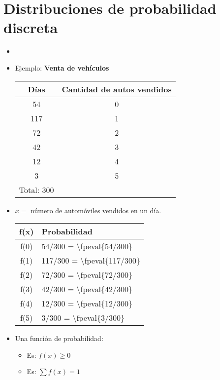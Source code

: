 \documentclass{article}
\begin{document}
\section{Distribuciones de probabilidad discreta}
\begin{itemize}
    \item {} 
    \item Ejemplo: \textbf{Venta de vehículos}
        \begin{center}
            \begin{tabular}{ |c|c| }
                \hline
                    Días & Cantidad de autos vendidos \\
                \hline
                    54 & 0 \\ 
                    117 &1 \\ 
                    72&2 \\ 
                    42&3 \\ 
                    12&4 \\ 
                    3&5 \\ 
                \hline
                    Total: 300 & \\ 
                \hline
            \end{tabular}
        \end{center}

    \item $x=$ número de automóviles vendidos en un día.  
        \begin{center}
            \begin{tabular}{ |c|l| }
                \hline
                    f(x) &  Probabilidad   \\
                \hline
                    f(0) & 54/300 = \num{\fpeval{54/300}} \\ 
                    f(1) & 117/300 = \num{\fpeval{117/300}}  \\ 
                    f(2) & 72/300 = \num{\fpeval{72/300}}\\ 
                    f(3) & 42/300 = \num{\fpeval{42/300}} \\  
                    f(4) & 12/300 = \num{\fpeval{12/300}} \\ 
                    f(5) & 3/300 = \num{\fpeval{3/300}} \\ 
                \hline
            \end{tabular}
        \end{center}
    
    \item Una función de probabilidad:
        \begin{itemize}
            \item Es: $\displaystyle f(x) \geq 0 $ 
            \item Es: $\displaystyle \sum f(x)=1$ 
        \end{itemize}
\end{itemize}
\end{document}
